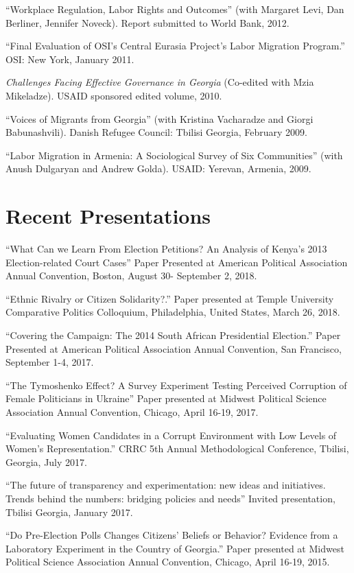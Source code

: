 \documentclass[margin,line]{res}
\begin{document}
{\begin{resume}
 ``Workplace Regulation, Labor Rights and Outcomes'' (with Margaret Levi, Dan Berliner, Jennifer Noveck). Report submitted to World Bank,  2012. 

``Final Evaluation of OSI's Central Eurasia Project's Labor Migration
Program.'' OSI: New York, January 2011. 

\emph{Challenges Facing Effective Governance in Georgia} (Co-edited with Mzia Mikeladze). USAID sponsored edited volume, 2010.  

``Voices of Migrants
from Georgia''  (with Kristina Vacharadze and Giorgi Babunashvili).
Danish Refugee Council: Tbilisi Georgia, February 2009.

``Labor Migration in Armenia:
A Sociological Survey of Six Communities'' (with Anush Dulgaryan and
Andrew Golda).  USAID: Yerevan, Armenia, 2009.

\section{\sc Recent Presentations}

``What Can we Learn From Election Petitions? An Analysis of Kenya's
2013 Election-related Court Cases''  Paper Presented at
American Political Association Annual Convention, Boston, August 30-
September 2, 2018.

 ``Ethnic Rivalry or Citizen Solidarity?.'' Paper presented at Temple
 University Comparative Politics Colloquium, Philadelphia, United
 States, March 26, 2018.

``Covering the Campaign: The 2014 South African Presidential Election.'' Paper Presented at
American Political Association Annual Convention, San Francisco, September
1-4, 2017.

``The Tymoshenko Effect? A Survey Experiment Testing Perceived Corruption of Female Politicians in Ukraine''
Paper presented at Midwest Political Science Association Annual
Convention, Chicago, April 16-19, 2017.

``Evaluating Women Candidates in a Corrupt Environment with Low Levels of Women’s Representation.''
CRRC 5th Annual Methodological Conference, Tbilisi, Georgia, July 2017.

``The future of transparency and experimentation: new ideas and
initiatives. Trends behind the numbers: bridging policies and needs''
Invited presentation, Tbilisi Georgia, January 2017. 

``Do Pre-Election Polls Changes Citizens' Beliefs or Behavior?
Evidence from a Laboratory Experiment in the Country of Georgia.''
Paper presented at Midwest Political Science Association Annual
Convention, Chicago, April 16-19, 2015.


\end{resume}}
\end{document}

